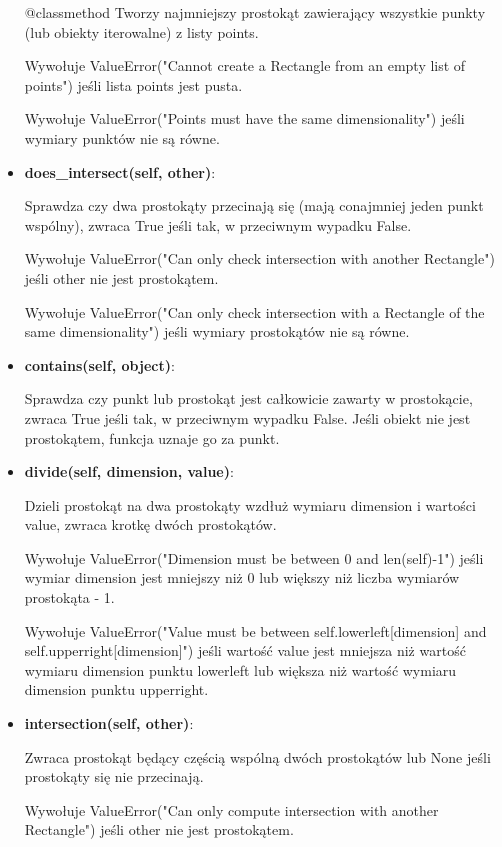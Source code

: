 \documentclass{lab}
\begin{document}
\begin{itemize}
  @classmethod Tworzy najmniejszy prostokąt zawierający wszystkie punkty (lub obiekty iterowalne) z listy points.

  Wywołuje ValueError("Cannot create a Rectangle from an empty list of points") jeśli lista points jest pusta.

  Wywołuje ValueError("Points must have the same dimensionality") jeśli wymiary punktów nie są równe.

  \item \textbf{does\_intersect(self, other)}:
  
  Sprawdza czy dwa prostokąty przecinają się (mają conajmniej jeden punkt wspólny), zwraca True jeśli tak, w przeciwnym wypadku False.

  Wywołuje ValueError("Can only check intersection with another Rectangle") jeśli other nie jest prostokątem.

  Wywołuje ValueError("Can only check intersection with a Rectangle of the same dimensionality") jeśli wymiary prostokątów nie są równe.

  \item \textbf{contains(self, object)}:
  
  Sprawdza czy punkt lub prostokąt jest całkowicie zawarty w prostokącie, zwraca True jeśli tak, w przeciwnym wypadku False. Jeśli obiekt nie jest prostokątem, funkcja uznaje go za punkt.

  \item \textbf{divide(self, dimension, value)}:
  
  Dzieli prostokąt na dwa prostokąty wzdłuż wymiaru dimension i wartości value, zwraca krotkę dwóch prostokątów.

  Wywołuje ValueError("Dimension must be between 0 and {len(self)-1}") jeśli wymiar dimension jest mniejszy niż 0 lub większy niż liczba wymiarów prostokąta - 1.

  Wywołuje ValueError("Value must be between {self.lowerleft[dimension]} and {self.upperright[dimension]}") jeśli wartość value jest mniejsza niż wartość wymiaru dimension punktu lowerleft lub większa niż wartość wymiaru dimension punktu upperright.

  \item \textbf{intersection(self, other)}:
  
  Zwraca prostokąt będący częścią wspólną dwóch prostokątów lub None jeśli prostokąty się nie przecinają.

  Wywołuje ValueError("Can only compute intersection with another Rectangle") jeśli other nie jest prostokątem.


\end{itemize}
\end{document}
